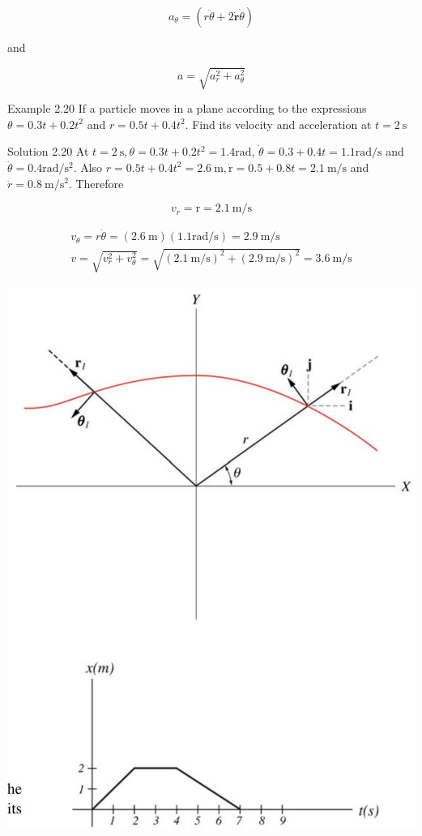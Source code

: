 \documentclass[10pt]{article}
\begin{document}
$$
a_{\theta}=(r \ddot{\theta}+2 \dot{\mathbf{r}} \dot{\theta})
$$

and

$$
a=\sqrt{a_{r}^{2}+a_{\theta}^{2}}
$$

Example 2.20 If a particle moves in a plane according to the expressions $\theta=0.3 t+0.2 t^{2}$ and $r=0.5 t+0.4 t^{2}$. Find its velocity and acceleration at $t=2 \mathrm{~s}$

Solution 2.20 At $t=2 \mathrm{~s}, \theta=0.3 t+0.2 t^{2}=1.4 \mathrm{rad}$, $\dot{\theta}=0.3+0.4 t=1.1 \mathrm{rad} / \mathrm{s}$ and $\ddot{\theta}=0.4 \mathrm{rad} / \mathrm{s}^{2}$. Also $r=0.5 t+0.4 t^{2}=2.6 \mathrm{~m}, \dot{\mathrm{r}}=0.5+0.8 t=2.1 \mathrm{~m} / \mathrm{s}$ and $\ddot{r}=0.8 \mathrm{~m} / \mathrm{s}^{2}$. Therefore

$$
v_{r}=\mathrm{r}=2.1 \mathrm{~m} / \mathrm{s}
$$

$$
\begin{gathered}
v_{\theta}=r \dot{\theta}=(2.6 \mathrm{~m})(1.1 \mathrm{rad} / \mathrm{s})=2.9 \mathrm{~m} / \mathrm{s} \\
v=\sqrt{v_{r}^{2}+v_{\theta}^{2}}=\sqrt{(2.1 \mathrm{~m} / \mathrm{s})^{2}+(2.9 \mathrm{~m} / \mathrm{s})^{2}}=3.6 \mathrm{~m} / \mathrm{s}
\end{gathered}
$$

\begin{center}
\includegraphics[max width=\textwidth]{2024_09_13_db1f357d2aad0a03eb2eg-044(1)}
\end{center}
\end{document}
